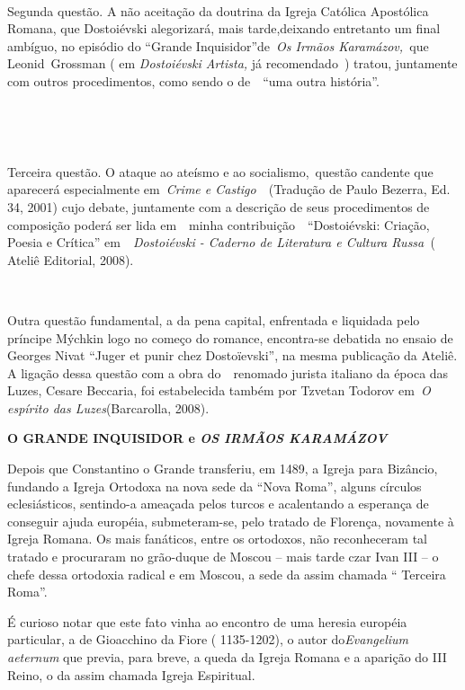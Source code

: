 ~

Segunda questão. A não aceitação da doutrina da Igreja Católica
Apostólica Romana, que Dostoiévski alegorizará, mais tarde,deixando
entretanto um final ambíguo, no episódio do ``Grande
Inquisidor''de~\emph{Os Irmãos Karamázov,~}que Leonid\emph{~}Grossman (
em \emph{Dostoiévski Artista,} já recomendado~) tratou, juntamente com
outros procedimentos, como sendo o de~~``uma outra história''.

~

\emph{~}

Terceira questão. O ataque ao ateísmo e ao socialismo,~questão candente
que aparecerá especialmente em~\emph{Crime e Castigo}~~(Tradução de
Paulo Bezerra, Ed. 34, 2001) cujo debate, juntamente com a descrição de
seus procedimentos de composição poderá ser lida em~~minha
contribuição~~``Dostoiévski: Criação, Poesia e Crítica''
em~~\emph{Dostoiévski - Caderno de Literatura e Cultura Russa~}( Ateliê
Editorial, 2008).

~

Outra questão fundamental, a da pena capital, enfrentada e liquidada
pelo príncipe Mýchkin logo no começo do romance, encontra-se debatida no
ensaio de Georges Nivat ``Juger et punir chez Dostoïevski'', na mesma
publicação da Ateliê. A ligação dessa questão com a obra do~~renomado
jurista italiano da época das Luzes, Cesare Beccaria, foi estabelecida
também por Tzvetan Todorov em~\emph{O espírito das Luzes}(Barcarolla,
2008).

\textbf{O GRANDE INQUISIDOR e \emph{OS IRMÃOS KARAMÁZOV}}

Depois que Constantino o Grande transferiu, em 1489, a Igreja para
Bizâncio, fundando a Igreja Ortodoxa na nova sede da ``Nova Roma'',
alguns círculos eclesiásticos, sentindo-a ameaçada pelos turcos e
acalentando a esperança de conseguir ajuda européia, submeteram-se, pelo
tratado de Florença, novamente à Igreja Romana. Os mais fanáticos, entre
os ortodoxos, não reconheceram tal tratado e procuraram no grão-duque de
Moscou -- mais tarde czar Ivan III -- o chefe dessa ortodoxia radical e
em Moscou, a sede da assim chamada `` Terceira Roma''.

É curioso notar que este fato vinha ao encontro de uma heresia européia
particular, a de Gioacchino da Fiore ( 1135-1202), o autor
do\emph{Evangelium aeternum} que previa, para breve, a queda da Igreja
Romana e a aparição do III Reino, o da assim chamada Igreja Espiritual.

